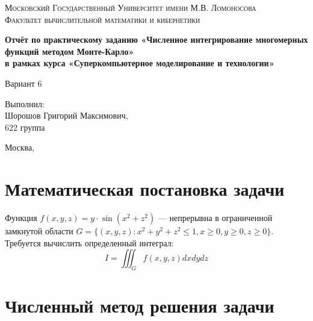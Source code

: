 \documentclass[oneside, final, 12pt]{extarticle}
\begin{document}
\normalsize

\begin{titlepage}
    \begin{center}
        \textsc{Московский Государственный Университет имени М.В. Ломоносова\\[5mm]
            Факультет вычислительной математики и кибернетики}
        \centerline{\hfill\hrulefill\hrulefill\hfill}
    \end{center}

    \vfill
    \vfill
    \vfill
    \vfill
    \begin{center}
        \Large
        \textbf{Отчёт по практическому заданию «Численное интегрирование многомерных функций
            методом Монте-Карло» \\
            в рамках курса
            «Суперкомпьютерное моделирование и технологии»}
    \end{center}

    \vfill
    \vfill
    \vfill
    \hfill
    \begin{flushright}
        Вариант 6
    \end{flushright}

    \begin{flushright}
        Выполнил: \\
        Шорошов Григорий Максимович, \\
        622 группа \\[5mm]
    \end{flushright}

    \vfill
    \vfill
    \vfill
    \begin{center}
        Москва, \the\year
    \end{center}
\end{titlepage}

\parindent=1cm

\newpage
\section{Математическая постановка задачи}

Функция $ f(x, y, z) = y \cdot \sin ( x^2 + z^2 ) $ --- непрерывна в ограниченной замкнутой области $ G = \{ (x, y, z): x^2 + y^2 + z^2 \leq 1, x \geq 0, y \geq 0, z \geq 0\} $.
Требуется вычислить определенный интеграл:
$$
    I = \iiint_{G} f(x, y ,z) dx dy dz
$$

\section{Численный метод решения задачи}
\end{document}
